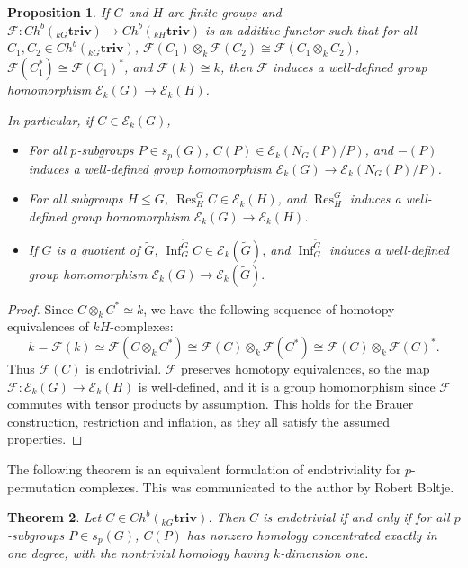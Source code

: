 \documentclass[10pt,letterpaper, boxed, cm]{amsart}
\newcommand{\Res}{\operatorname{Res}}
\newcommand{\Inf}{\operatorname{Inf}}
\newcommand{\triv}{\mathbf{triv}}
\newcommand{\calE}{\mathcal{E}}
\newcommand{\calF}{\mathcal{F}}
\newtheorem{theorem}{Theorem}[section]
\newtheorem{prop}[theorem]{Proposition}
\theoremstyle{remark}
\theoremstyle{definition}
\begin{document}
	\begin{prop}\label{brauerpreservesendotriviality}
        If $G$ and $H$ are finite groups and $\calF: Ch^b({}_{kG}\triv) \to Ch^b({}_{kH}\triv)$ is an additive functor such that for all $C_1,C_2 \in Ch^b({}_{kG}\triv)$, $\mathcal{F}(C_1)\otimes_k \mathcal{F}(C_2) \cong \mathcal{F}(C_1\otimes_k C_2)$, $\mathcal{F}(C_1^*) \cong\mathcal{F}(C_1)^*$, and $\mathcal{F}(k) \cong k$, then $\mathcal{F}$ induces a well-defined group homomorphism $\calE_k(G) \to \calE_k(H)$.

		In particular, if $C \in \calE_k(G)$,
        \begin{itemize}
            \item For all $p$-subgroups $P \in s_p(G)$, $C(P) \in \calE_k(N_G(P)/P)$, and $-(P)$ induces a well-defined group homomorphism $\calE_k(G) \to \calE_k(N_G(P)/P)$.
            \item For all subgroups $H \leq G$, $\Res^G_H C \in \calE_k(H)$, and $\Res^G_H$ induces a well-defined group homomorphism $\calE_k(G) \to \calE_k(H)$.
            \item If $G$ is a quotient of $\tilde{G}$, $\Inf^{\tilde{G}}_G C \in \calE_k(\tilde{G})$, and $\Inf^{\tilde{G}}_G$ induces a well-defined group homomorphism $\calE_k(G) \to \calE_k(\tilde{G}). $
        \end{itemize}

	\end{prop}
	\begin{proof}
        Since $C \otimes_k C^* \simeq k$, we have the following sequence of homotopy equivalences of $kH$-complexes: \[k = \calF(k) \simeq \calF(C\otimes_k C^*) \cong \calF(C)\otimes_k \calF(C^*) \cong \calF(C) \otimes_k \calF(C)^*.\] Thus $\calF(C)$ is endotrivial. $\calF$ preserves homotopy equivalences, so the map $\calF: \calE_k(G) \to \calE_k(H)$ is well-defined, and it is a group homomorphism since $\calF$ commutes with tensor products by assumption. This holds for the Brauer construction, restriction and inflation, as they all satisfy the assumed properties.
	\end{proof}

	The following theorem is an equivalent formulation of endotriviality for $p$-permutation complexes. This was communicated to the author by Robert Boltje.

	\begin{theorem}\label{endotrivdef2}
		Let $C \in Ch^b({}_{kG}\textbf{triv})$. Then $C$ is endotrivial if and only if for all $p$-subgroups $P \in s_p(G)$, $C(P)$ has nonzero homology concentrated exactly in one degree, with the nontrivial homology having $k$-dimension one.
	\end{theorem}
\end{document}
